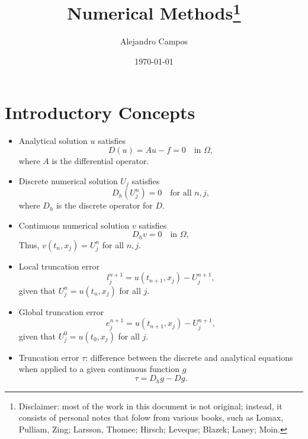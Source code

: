 \documentclass[oneside,a4paper,11pt]{report}
\title{Numerical Methods\thanks{Disclaimer: most of the work in this document is not original; instead, it consists of personal notes that folow from various books, such as Lomax, Pulliam, Zing; Larsson, Thomee; Hirsch; Leveque; Blazek; Laney; Moin.}}
\date{\today}
\author{Alejandro Campos}
\begin{document}
\maketitle
\tableofcontents

\part{Introductory Concepts}
\begin{itemize}
\item Analytical solution $u$ satisfies
\begin{equation}
D(u) = Au - f = 0\quad \text{in } \Omega,
\label{pde}
\end{equation}
where $A$ is the differential operator.

\item Discrete numerical solution $U_j$ satisfies 
\begin{equation}
D_h(U^n_j) = 0 \quad \text{for all } n, j ,
\end{equation}
where $D_h$ is the discrete operator for $D$.

\item Continuous numerical solution $v$ satisfies
\begin{equation}
D_hv = 0 \quad \text{in } \Omega,
\label{npde}
\end{equation}
Thus, $v(t_n, x_j) = U^n_j$ for all $n, j$.

\item Local truncation error 
\begin{equation}
l^{n+1}_j = u(t_{n+1}, x_j) - U^{n+1}_j,
\end{equation}
given that $U^n_j = u(t_n, x_j)$ for all $j$. 

\item Global truncation error
\begin{equation}
e^{n+1}_j = u(t_{n+1}, x_j) - U^{n+1}_j,
\end{equation}
given that $U^0_j = u(t_0, x_j)$ for all $j$.

\item Truncation error $\tau$: difference between the discrete and analytical equations when applied to a given continuous function $g$
\begin{equation}
\tau = D_hg - Dg.
\label{trunc}
\end{equation}


\end{itemize}
\end{document}
